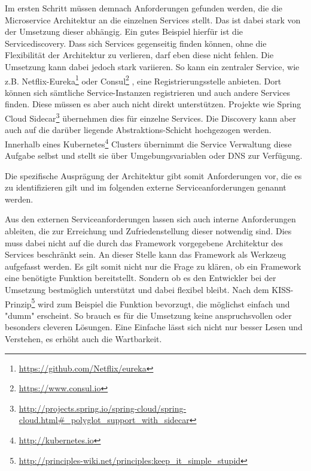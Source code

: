 
Im ersten Schritt müssen demnach Anforderungen gefunden werden, die die Microservice Architektur an die einzelnen Services stellt. Das ist dabei stark von der Umsetzung dieser abhängig. Ein gutes Beispiel hierfür ist die Servicediscovery. Dass sich Services gegenseitig finden können, ohne die Flexibilität der Architektur zu verlieren, darf eben diese nicht fehlen. Die Umsetzung kann dabei jedoch stark variieren. So kann ein zentraler Service, wie z.B. Netflix-Eureka\footnote{
\url{https://github.com/Netflix/eureka}
}
oder Consul\footnote{
\url{https://www.consul.io}
}
, eine Registrierungsstelle anbieten. Dort können sich sämtliche Service-Instanzen registrieren und auch andere Services finden. Diese müssen es aber auch nicht direkt unterstützen. Projekte wie Spring Cloud Sidecar\footnote{
\url{http://projects.spring.io/spring-cloud/spring-cloud.html\#_polyglot_support_with_sidecar}
}
übernehmen dies für einzelne Services. Die Discovery kann aber auch auf die darüber liegende Abstraktions-Schicht hochgezogen werden. Innerhalb eines Kubernetes\footnote{
\url{http://kubernetes.io}
}
Clusters übernimmt die Service Verwaltung diese Aufgabe selbst und stellt sie über Umgebungsvariablen oder DNS zur Verfügung. 


Die spezifische Ausprägung der Architektur gibt somit Anforderungen vor, die es zu identifizieren gilt und im folgenden externe Serviceanforderungen genannt werden.


Aus den externen Serviceanforderungen lassen sich auch interne Anforderungen ableiten, die zur Erreichung und Zufriedenstellung dieser notwendig sind. Dies muss dabei nicht auf die durch das Framework vorgegebene Architektur des Services beschränkt sein. An dieser Stelle kann das Framework als Werkzeug aufgefasst werden. Es gilt somit nicht nur die Frage zu klären, ob ein Framework eine benötigte Funktion bereitstellt. Sondern ob es den Entwickler bei der Umsetzung bestmöglich unterstützt und dabei flexibel bleibt. Nach dem KISS-Prinzip\footnote{
\url{http://principles-wiki.net/principles:keep_it_simple_stupid}
} 
wird zum Beispiel die Funktion bevorzugt, die möglichst einfach und "dumm" erscheint. So brauch es für die Umsetzung keine anspruchsvollen oder besonders cleveren Lösungen. Eine Einfache lässt sich nicht nur besser Lesen und Verstehen, es erhöht auch die Wartbarkeit.  

